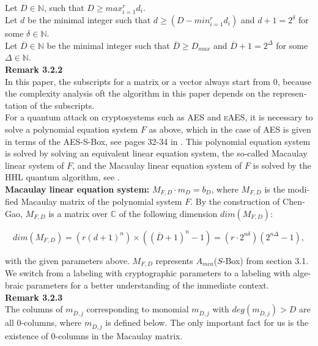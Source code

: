 \documentclass[a4paper,11pt]{article}
\begin{document}
\begin{otherlanguage}{english}
\noindent
Let $D \in \mathbb{N}$, such that $D \geq max_{i=1}^r d_i$. \\
Let $d$ be the minimal integer such that $d \geq (D - min_{i=1}^r d_i)$ and $d+1= 2^\delta$ for some $\delta \in \mathbb{N}$. \\
Let $\overline{D} \in \mathbb{N}$ be the minimal integer such that $\overline{D} \geq D_{max}$ and $\overline{D}+1 = 2^\Delta$ for some $\Delta \in \mathbb{N}$. \\ 

\noindent
\textbf{Remark 3.2.2} \\
In this paper, the subscripts for a matrix or a vector always start from 0, because the complexity analysis oft the algorithm in this paper depends on the representation of the subscripts. \\

\noindent
For a quantum attack on cryptosystems such as \textsc{AES} and \textsc{eAES}, it is necessary to solve a polynomial equation system $F$ as above, which in the case of \textsc{AES} is given in terms of the \textsc{AES}-S-Box, see pages 32-34 in \cite{QAA}. This polynomial equation system is solved by solving an equivalent linear equation system, the so-called Macaulay linear system \cite{MCA} of $F$, and the Macaulay linear equation system of $F$ is solved by the \textsc{HHL} quantum algorithm, see \cite{HHL}.\\

\noindent
\textbf{Macaulay linear equation system:} $M_{F,D} \cdot m_D = b_D$,
where $M_{F,D}$ is the modified Macaulay matrix of the polynomial system $F$. By the construction of Chen-Gao, $M_{F,D}$ is a matrix over $\mathbb{C}$ of the following dimension $dim(M_{F,D})$:

$$dim(M_{F,D})= ( r (d+1)^n ) \times ((\overline{D} + 1 )^n -1) 
= (r \cdot 2^{n \delta})(2^{n \Delta} -1 ),$$

\noindent
with the given parameters above. $M_{F,D}$ represents $A_{mca}$($S$-Box) from section 3.1. We switch from a labeling with cryptographic parameters to a labeling with algebraic parameters for a better understanding of the immediate context.\\

\noindent
\textbf{Remark 3.2.3} \\
The columns of $m_{\overline{D},j}$ corresponding to monomial $m_{\overline{D},j}$ with $deg(m_{\overline{D},j}) > D$ are all $0$-columns, where $m_{\overline{D},j}$ is defined below. The only important fact for us is the existence of $0$-columns in the Macaulay matrix. \\


\end{otherlanguage}
\end{document}
